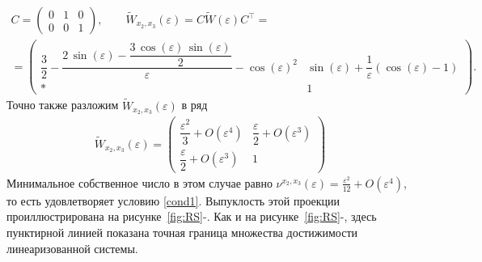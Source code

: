 \documentclass[../main.tex]{subfiles}
\begin{document}
\begin{enumerate}
\begin{gather*}
            C = \begin{pmatrix}
                0 & 1 & 0 \\
                0 & 0 & 1
            \end{pmatrix}, \qquad
            \widetilde{W}_{x_2,x_3}(\varepsilon) =  C \widetilde{W} (\varepsilon) C^{\top}  =\\=\begin{pmatrix}
                \dfrac{3}{2}-\dfrac{2\,\sin\left(\varepsilon \right)-\dfrac{3\,\cos\left(\varepsilon \right)\,\sin\left(\varepsilon \right)}{2}}{\varepsilon }-{\cos\left(\varepsilon \right)}^2 & \sin\left(\varepsilon \right)+\dfrac{1}{\varepsilon } \left(\cos\left(\varepsilon \right)-1 \right)\\[8pt]
                * & 
                1 
            \end{pmatrix}.
        \end{gather*}
        Точно также разложим $ \widetilde{W}_{x_2,x_3}(\varepsilon) $ в ряд
        \begin{gather*}
            \widetilde{W}_{x_2,x_3}(\varepsilon)  = \begin{pmatrix}
                \dfrac{\varepsilon^2}{3} + O(\varepsilon^4) &
                \dfrac{\varepsilon }{2} + O(\varepsilon^3) \\[8pt]
                \dfrac{\varepsilon }{2} + O(\varepsilon^3) & 1
            \end{pmatrix}
        \end{gather*}
        Минимальное собственное число в этом случае равно $ \nu^{x_2,x_3}(\varepsilon) = \frac{\varepsilon^2}{12} + O(\varepsilon^4) $, то есть удовлетворяет условию \eqref{cond1}. Выпуклость этой проекции проиллюстрирована на рисунке~\ref{fig:RS}-.  Как и на рисунке~\ref{fig:RS}-, здесь пунктирной линией показана точная граница множества достижимости линеаризованной системы.
    \end{enumerate}
\end{document}
